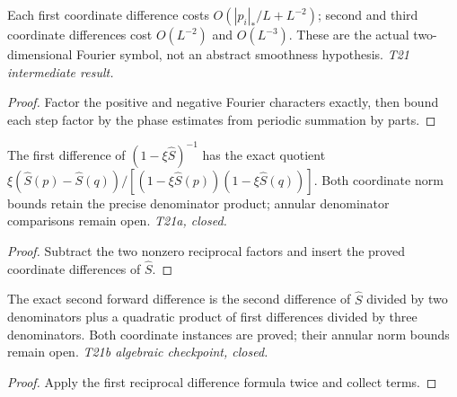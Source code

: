 \begin{lemma}
  \label{lem:symbol-diff-shat}
  \leanok
  Each first coordinate difference costs $O(|p_i|_*/L+L^{-2})$;
  second and third coordinate differences cost $O(L^{-2})$ and $O(L^{-3})$.
  These are the actual two-dimensional Fourier symbol, not an abstract
  smoothness hypothesis. \emph{T21 intermediate result.}
\end{lemma}
\begin{proof}\leanok
  Factor the positive and negative Fourier characters exactly, then bound
  each step factor by the phase estimates from periodic summation by parts.
\end{proof}

\begin{lemma}
  \label{lem:symbol-diff-reciprocal-one}
  \leanok
  The first difference of $(1-\xi\widehat S)^{-1}$ has the exact quotient
  $\xi(\widehat S(p)-\widehat S(q))/
  [(1-\xi\widehat S(p))(1-\xi\widehat S(q))]$.
  Both coordinate norm bounds retain the precise denominator product;
  annular denominator comparisons remain open. \emph{T21a, closed.}
\end{lemma}
\begin{proof}\leanok
  Subtract the two nonzero reciprocal factors and insert the proved
  coordinate differences of $\widehat S$.
\end{proof}

\begin{lemma}
  \label{lem:symbol-diff-reciprocal-two}
  \leanok
  The exact second forward difference is the second difference of
  $\widehat S$ divided by two denominators plus a quadratic product of
  first differences divided by three denominators. Both coordinate
  instances are proved; their annular norm bounds remain open.
  \emph{T21b algebraic checkpoint, closed.}
\end{lemma}
\begin{proof}\leanok
  Apply the first reciprocal difference formula twice and collect terms.
\end{proof}

